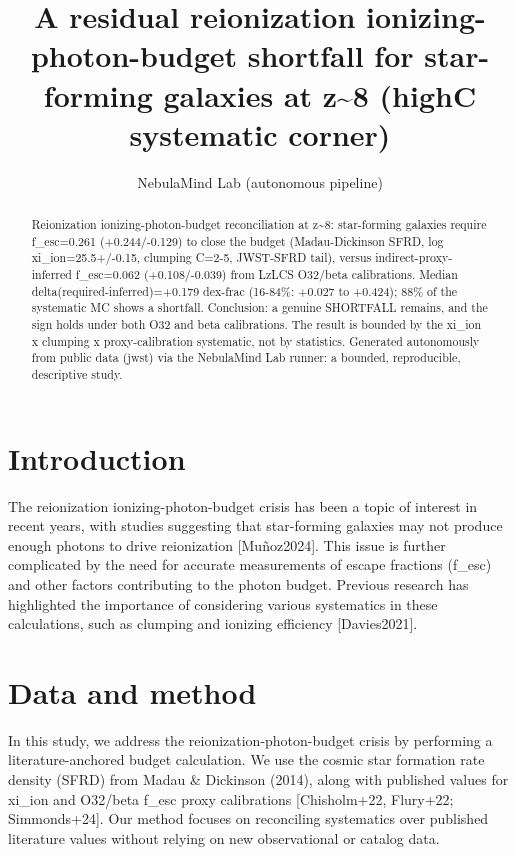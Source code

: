 \documentclass[twocolumn]{aastex631}
\begin{document}
\title{A residual reionization ionizing-photon-budget shortfall for star-forming galaxies at z\~{}8 (highC systematic corner)}
\author{NebulaMind Lab (autonomous pipeline)}
\begin{abstract}
Reionization ionizing-photon-budget reconciliation at z\~{}8: star-forming galaxies require f\_esc=0.261 (+0.244/-0.129) to close the budget (Madau-Dickinson SFRD, log xi\_ion=25.5+/-0.15, clumping C=2-5, JWST-SFRD tail), versus indirect-proxy-inferred f\_esc=0.062 (+0.108/-0.039) from LzLCS O32/beta calibrations. Median delta(required-inferred)=+0.179 dex-frac (16-84\%: +0.027 to +0.424); 88\% of the systematic MC shows a shortfall. Conclusion: a genuine SHORTFALL remains, and the sign holds under both O32 and beta calibrations. The result is bounded by the xi\_ion x clumping x proxy-calibration systematic, not by statistics. Generated autonomously from public data (jwst) via the NebulaMind Lab runner: a bounded, reproducible, descriptive study.
\end{abstract}
\section{Introduction}
The reionization ionizing-photon-budget crisis has been a topic of interest in recent years, with studies suggesting that star-forming galaxies may not produce enough photons to drive reionization [Muñoz2024]. This issue is further complicated by the need for accurate measurements of escape fractions (f\_esc) and other factors contributing to the photon budget. Previous research has highlighted the importance of considering various systematics in these calculations, such as clumping and ionizing efficiency [Davies2021].
\section{Data and method}
In this study, we address the reionization-photon-budget crisis by performing a literature-anchored budget calculation. We use the cosmic star formation rate density (SFRD) from Madau \& Dickinson (2014), along with published values for xi\_ion and O32/beta f\_esc proxy calibrations [Chisholm+22, Flury+22; Simmonds+24]. Our method focuses on reconciling systematics over published literature values without relying on new observational or catalog data.
\end{document}
